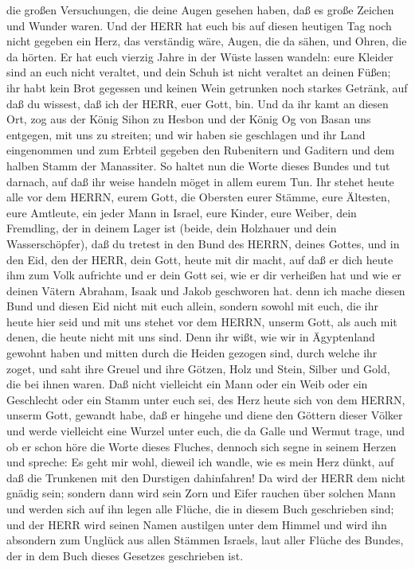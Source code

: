  die großen Versuchungen, die deine Augen gesehen haben, daß
es große Zeichen und Wunder waren.  Und der HERR hat euch
bis auf diesen heutigen Tag noch nicht gegeben ein Herz, das verständig
wäre, Augen, die da sähen, und Ohren, die da hörten.  Er hat
euch vierzig Jahre in der Wüste lassen wandeln: eure Kleider sind an
euch nicht veraltet, und dein Schuh ist nicht veraltet an deinen Füßen;
 ihr habt kein Brot gegessen und keinen Wein getrunken noch
starkes Getränk, auf daß du wissest, daß ich der HERR, euer Gott, bin.
 Und da ihr kamt an diesen Ort, zog aus der König Sihon zu
Hesbon und der König Og von Basan uns entgegen, mit uns zu streiten; und
wir haben sie geschlagen  und ihr Land eingenommen und zum
Erbteil gegeben den Rubenitern und Gaditern und dem halben Stamm der
Manassiter.  So haltet nun die Worte dieses Bundes und tut
darnach, auf daß ihr weise handeln möget in allem eurem Tun.
 Ihr stehet heute alle vor dem HERRN, eurem Gott, die
Obersten eurer Stämme, eure Ältesten, eure Amtleute, ein jeder Mann in
Israel,  eure Kinder, eure Weiber, dein Fremdling, der in
deinem Lager ist (beide, dein Holzhauer und dein Wasserschöpfer),
 daß du tretest in den Bund des HERRN, deines Gottes, und
in den Eid, den der HERR, dein Gott, heute mit dir macht, 
auf daß er dich heute ihm zum Volk aufrichte und er dein Gott sei, wie
er dir verheißen hat und wie er deinen Vätern Abraham, Isaak und Jakob
geschworen hat.  denn ich mache diesen Bund und diesen Eid
nicht mit euch allein,  sondern sowohl mit euch, die ihr
heute hier seid und mit uns stehet vor dem HERRN, unserm Gott, als auch
mit denen, die heute nicht mit uns sind.  Denn ihr wißt,
wie wir in Ägyptenland gewohnt haben und mitten durch die Heiden gezogen
sind, durch welche ihr zoget,  und saht ihre Greuel und
ihre Götzen, Holz und Stein, Silber und Gold, die bei ihnen waren.
 Daß nicht vielleicht ein Mann oder ein Weib oder ein
Geschlecht oder ein Stamm unter euch sei, des Herz heute sich von dem
HERRN, unserm Gott, gewandt habe, daß er hingehe und diene den Göttern
dieser Völker und werde vielleicht eine Wurzel unter euch, die da Galle
und Wermut trage,  und ob er schon höre die Worte dieses
Fluches, dennoch sich segne in seinem Herzen und spreche: Es geht mir
wohl, dieweil ich wandle, wie es mein Herz dünkt, auf daß die Trunkenen
mit den Durstigen dahinfahren!  Da wird der HERR dem nicht
gnädig sein; sondern dann wird sein Zorn und Eifer rauchen über solchen
Mann und werden sich auf ihn legen alle Flüche, die in diesem Buch
geschrieben sind; und der HERR wird seinen Namen austilgen unter dem
Himmel  und wird ihn absondern zum Unglück aus allen
Stämmen Israels, laut aller Flüche des Bundes, der in dem Buch dieses
Gesetzes geschrieben ist.

